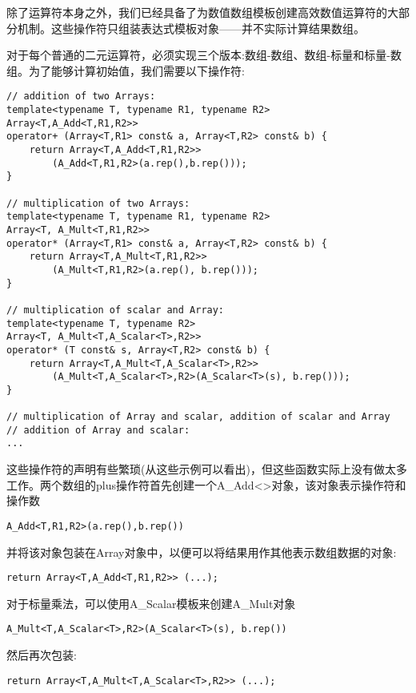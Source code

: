 除了运算符本身之外，我们已经具备了为数值数组模板创建高效数值运算符的大部分机制。这些操作符只组装表达式模板对象——并不实际计算结果数组。

对于每个普通的二元运算符，必须实现三个版本:数组-数组、数组-标量和标量-数组。为了能够计算初始值，我们需要以下操作符:

\begin{lstlisting}[style=styleCXX]
// addition of two Arrays:
template<typename T, typename R1, typename R2>
Array<T,A_Add<T,R1,R2>>
operator+ (Array<T,R1> const& a, Array<T,R2> const& b) {
	return Array<T,A_Add<T,R1,R2>>
		(A_Add<T,R1,R2>(a.rep(),b.rep()));
}

// multiplication of two Arrays:
template<typename T, typename R1, typename R2>
Array<T, A_Mult<T,R1,R2>>
operator* (Array<T,R1> const& a, Array<T,R2> const& b) {
	return Array<T,A_Mult<T,R1,R2>>
		(A_Mult<T,R1,R2>(a.rep(), b.rep()));
}

// multiplication of scalar and Array:
template<typename T, typename R2>
Array<T, A_Mult<T,A_Scalar<T>,R2>>
operator* (T const& s, Array<T,R2> const& b) {
	return Array<T,A_Mult<T,A_Scalar<T>,R2>>
		(A_Mult<T,A_Scalar<T>,R2>(A_Scalar<T>(s), b.rep()));
}

// multiplication of Array and scalar, addition of scalar and Array
// addition of Array and scalar:
...
\end{lstlisting}

这些操作符的声明有些繁琐(从这些示例可以看出)，但这些函数实际上没有做太多工作。两个数组的plus操作符首先创建一个A\_Add<>对象，该对象表示操作符和操作数

\begin{lstlisting}[style=styleCXX]
A_Add<T,R1,R2>(a.rep(),b.rep())
\end{lstlisting}

并将该对象包装在Array对象中，以便可以将结果用作其他表示数组数据的对象:

\begin{lstlisting}[style=styleCXX]
return Array<T,A_Add<T,R1,R2>> (...);
\end{lstlisting}

对于标量乘法，可以使用A\_Scalar模板来创建A\_Mult对象

\begin{lstlisting}[style=styleCXX]
A_Mult<T,A_Scalar<T>,R2>(A_Scalar<T>(s), b.rep())
\end{lstlisting}

然后再次包装:

\begin{lstlisting}[style=styleCXX]
return Array<T,A_Mult<T,A_Scalar<T>,R2>> (...);
\end{lstlisting}


